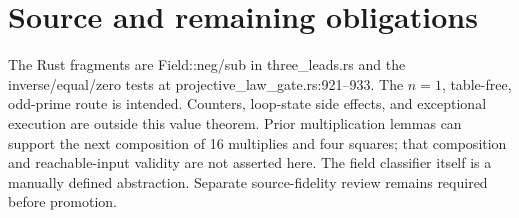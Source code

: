 \documentclass[10pt]{article}
\begin{document}
\section*{Source and remaining obligations}
The Rust fragments are Field::neg/sub in three\_leads.rs and the inverse/equal/zero tests at projective\_law\_gate.rs:921--933. The $n=1$, table-free, odd-prime route is intended. Counters, loop-state side effects, and exceptional execution are outside this value theorem. Prior multiplication lemmas can support the next composition of 16 multiplies and four squares; that composition and reachable-input validity are not asserted here. The field classifier itself is a manually defined abstraction. Separate source-fidelity review remains required before promotion.
\end{document}

